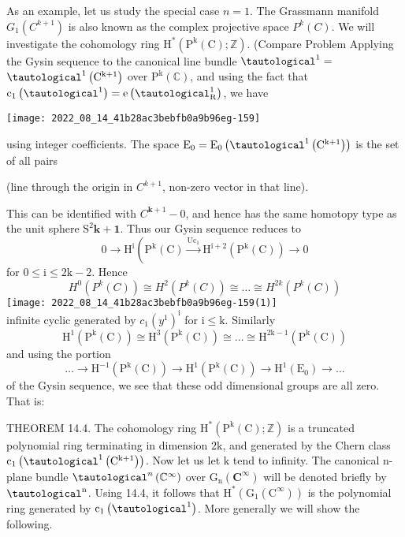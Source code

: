 \documentclass[10pt]{article}
\begin{document}
As an example, let us study the special case $n=1$. The Grassmann manifold $G_{1}\left(C^{k+1}\right)$ is also known as the complex projective space $P^{k}(C)$. We will investigate the cohomology ring $\mathrm{H}^{*}\left(\mathrm{P}^{\mathrm{k}}(\mathrm{C}) ; \mathbb{Z}\right)$. (Compare Problem Applying the Gysin sequence to the canonical line bundle $\tautological^{1}=$ $\tautological^{1}\left(\mathrm{C}^{\mathrm{k}+1}\right)$ over $\mathrm{P}^{\mathrm{k}}(\mathbb{C})$, and using the fact that $\mathrm{c}_{1}\left(\tautological^{1}\right)=\mathrm{e}\left(\tautological_{\mathrm{R}}^{1}\right)$, we have

\texttt{[image: 2022\_08\_14\_41b28ac3bebfb0a9b96eg-159]}

using integer coefficients. The space $\mathrm{E}_{0}=\mathrm{E}_{0}\left(\tautological^{1}\left(\mathrm{C}^{\mathrm{k}+1}\right)\right)$ is the set of all pairs

(line through the origin in $C^{k+1}$, non-zero vector in that line).

This can be identified with $C^{\mathbf{k}+1}-0$, and hence has the same homotopy type as the unit sphere $\mathrm{S}^{2} \mathbf{k + 1}$. Thus our Gysin sequence reduces to
$$
0 \longrightarrow \mathrm{H}^{\mathrm{i}}\left(\mathrm{P}^{\mathrm{k}}(\mathrm{C}) \stackrel{\mathrm{Uc}_{1}}{\longrightarrow} \mathrm{H}^{\mathrm{i}+2}\left(\mathrm{P}^{\mathrm{k}}(\mathrm{C})\right) \longrightarrow 0\right.
$$
for $0 \leq \mathrm{i} \leq 2 \mathrm{k}-2$. Hence
$$
H^{0}\left(P^{k}(C)\right) \cong H^{2}\left(P^{k}(C)\right) \cong \ldots \cong H^{2 k}\left(P^{k}(C)\right)
$$
\texttt{[image: 2022\_08\_14\_41b28ac3bebfb0a9b96eg-159(1)]}\\
infinite cyclic generated by $c_{1}\left(y^{1}\right)^{\mathrm{i}}$ for $\mathrm{i} \leq \mathrm{k}$. Similarly
$$
\mathrm{H}^{1}\left(\mathrm{P}^{\mathrm{k}}(\mathrm{C})\right) \cong \mathrm{H}^{3}\left(\mathrm{P}^{\mathrm{k}}(\mathrm{C})\right) \cong \ldots \cong \mathrm{H}^{2 \mathrm{k}-1}\left(\mathrm{P}^{\mathrm{k}}(\mathrm{C})\right)
$$
and using the portion
$$
\ldots \rightarrow \mathrm{H}^{-1}\left(\mathrm{P}^{\mathrm{k}}(\mathrm{C})\right) \rightarrow \mathrm{H}^{1}\left(\mathrm{P}^{\mathrm{k}}(\mathrm{C})\right) \rightarrow \mathrm{H}^{1}\left(\mathrm{E}_{0}\right) \rightarrow \ldots
$$
of the Gysin sequence, we see that these odd dimensional groups are all zero. That is:

THEOREM 14.4. The cohomology ring $\mathrm{H}^{*}\left(\mathrm{P}^{\mathrm{k}}(\mathrm{C}) ; \mathbb{Z}\right)$ is a truncated polynomial ring terminating in dimension $2 \mathrm{k}$, and generated by the Chern class $\mathrm{c}_{1}\left(\tautological^{1}\left(\mathrm{C}^{\mathrm{k}+1}\right)\right)$. Now let us let $\mathrm{k}$ tend to infinity. The canonical n-plane bundle $\tautological^{n}\left(\mathbb{C}^{\infty}\right)$ over $\mathrm{G}_{\mathrm{n}}\left(\mathbf{C}^{\infty}\right)$ will be denoted briefly by $\tautological^{\mathrm{n}}$. Using 14.4, it follows that $\mathrm{H}^{*}\left(\mathrm{G}_{1}\left(\mathrm{C}^{\infty}\right)\right)$ is the polynomial ring generated by $\mathrm{c}_{1}\left(\tautological^{1}\right)$. More generally we will show the following.
\end{document}
